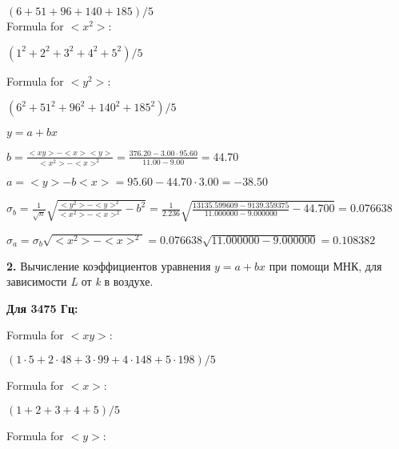 \documentclass[12pt,a4paper]{article}
\begin{document}
$(6 + 51 + 96 + 140 + 185) / 5$
\vspace{0.5cm}\\

Formula for $<x^2>$:
\vspace{0.5cm}

$(1^2 + 2^2 + 3^2 + 4^2 + 5^2) / 5$
\vspace{0.5cm}

Formula for $<y^2>:$
\vspace{0.5cm}

$(6^2 + 51^2 + 96^2 + 140^2 + 185^2) / 5$
\vspace{0.5cm}



$y = a + bx$
\vspace{0.5cm}

$b = \frac{<xy> - <x><y>}{<x^2> - <x>^2} = \frac{376.20 - 3.00 \cdot 95.60}{11.00 - 9.00} = 44.70$
\vspace{0.5cm}

$a =<y> - b<x> = 95.60 - 44.70 \cdot 3.00 = -38.50$
\vspace{0.5cm}

$\sigma_b = \frac{1}{\sqrt{n}} \sqrt { \frac{<y^2> - <y>^2}{<x^2> - <x>^2}  - b^2} = \frac{1}{2.236} \sqrt {\frac{13135.599609 - 9139.359375}{11.000000 - 9.000000} - 44.700} = 0.076638$
\vspace{0.5cm}

$\sigma_a = \sigma_b \sqrt{<x^2> - <x>^2} = 0.076638 \sqrt{11.000000 - 9.000000} = 0.108382$
\vspace{0.5cm}

\textbf{2.} Вычисление коэффициентов уравнения $y = a + bx$ при помощи МНК, для зависимости \textit{L} от \textit{k} в воздухе.
\vspace{0.5cm}

\textbf{Для 3475 Гц:}
\vspace{0.5cm}

Formula for $<xy>:$
\vspace{0.5cm}

$(1 \cdot 5 + 2 \cdot 48 + 3 \cdot 99 + 4 \cdot 148 + 5 \cdot 198) / 5$
\vspace{0.5cm}

Formula for $<x>:$
\vspace{0.5cm}

$(1 + 2 + 3 + 4 + 5) / 5$
\vspace{0.5cm}

Formula for $<y>:$
\vspace{0.5cm}
\end{document}

